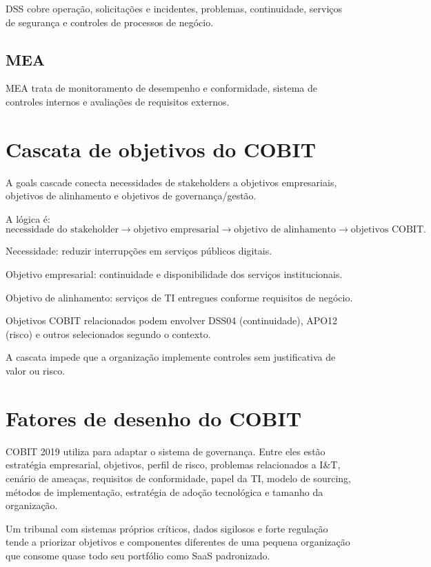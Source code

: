 DSS cobre operação, solicitações e incidentes, problemas, continuidade, serviços de segurança e controles de processos de negócio.

\subsection{MEA}

MEA trata de monitoramento de desempenho e conformidade, sistema de controles internos e avaliações de requisitos externos.

\section{Cascata de objetivos do COBIT}

A goals cascade conecta necessidades de stakeholders a objetivos empresariais, objetivos de alinhamento e objetivos de governança/gestão.

A lógica é:
\[
\text{necessidade do stakeholder}
\rightarrow
\text{objetivo empresarial}
\rightarrow
\text{objetivo de alinhamento}
\rightarrow
\text{objetivos COBIT}.
\]

\begin{exemplo}[cascata]
Necessidade: reduzir interrupções em serviços públicos digitais.

Objetivo empresarial: continuidade e disponibilidade dos serviços institucionais.

Objetivo de alinhamento: serviços de TI entregues conforme requisitos de negócio.

Objetivos COBIT relacionados podem envolver DSS04 (continuidade), APO12 (risco) e outros selecionados segundo o contexto.
\end{exemplo}

A cascata impede que a organização implemente controles sem justificativa de valor ou risco.

\section{Fatores de desenho do COBIT}

COBIT 2019 utiliza  para adaptar o sistema de governança. Entre eles estão estratégia empresarial, objetivos, perfil de risco, problemas relacionados a I\&T, cenário de ameaças, requisitos de conformidade, papel da TI, modelo de sourcing, métodos de implementação, estratégia de adoção tecnológica e tamanho da organização.

\begin{exemplo}[tailoring]
Um tribunal com sistemas próprios críticos, dados sigilosos e forte regulação tende a priorizar objetivos e componentes diferentes de uma pequena organização que consome quase todo seu portfólio como SaaS padronizado.
\end{exemplo}

